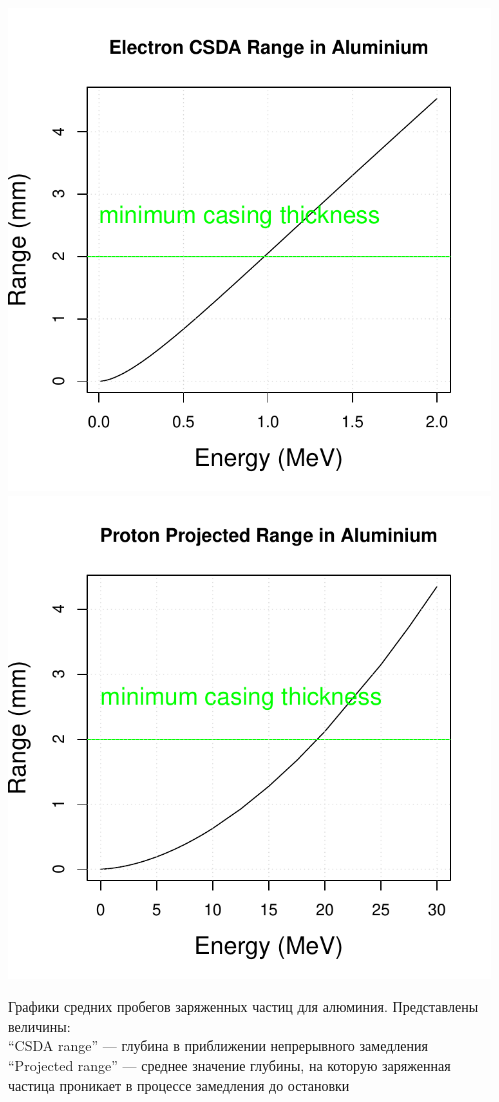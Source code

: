 \documentclass[t, aspectratio=43]{beamer}
\begin{document}
\begin{frame}
\begin{columns}[T]
\begin{column}{.5\textwidth}
\begin{block}{}
{	}
	\end{block}
\end{column}
\begin{column}{.5\textwidth}
	\begin{block}{}
	\begin{center}
		\includegraphics[width=0.5\linewidth]{images/edata}
		\includegraphics[width=0.5\linewidth]{images/pdata}
	\end{center}

	\tiny{Графики средних пробегов заряженных частиц для алюминия. Представлены величины: \\		``CSDA range'' --- глубина в приближении непрерывного замедления \\		``Projected range'' --- среднее значение глубины, на которую заряженная частица проникает в процессе замедления до остановки}

	\end{block}
\end{column}
\end{columns}
\end{frame}
\end{document}
